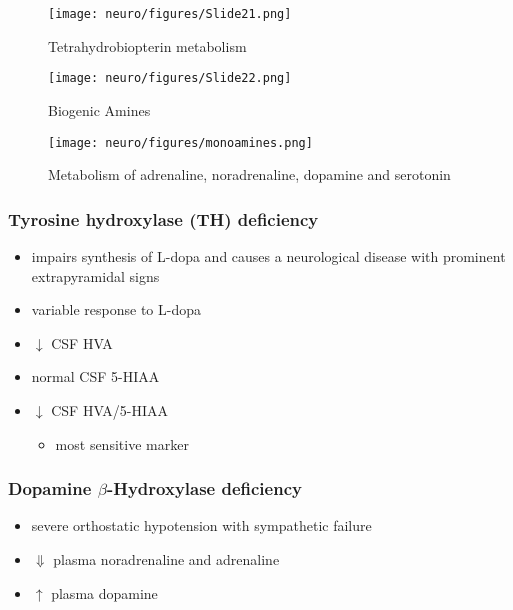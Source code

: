 \documentclass[12pt]{scrartcl}
\begin{document}
\begin{figure}[htbp]
\centering
\texttt{[image: neuro/figures/Slide21.png]}
\caption{\label{fig:orgaa9f3dc}Tetrahydrobiopterin metabolism}
\end{figure}

\begin{figure}[htbp]
\centering
\texttt{[image: neuro/figures/Slide22.png]}
\caption{\label{fig:org3f74000}Biogenic Amines}
\end{figure}

\begin{figure}[htbp]
\centering
\texttt{[image: neuro/figures/monoamines.png]}
\caption{\label{fig:orga8bad62}Metabolism of adrenaline, noradrenaline, dopamine and serotonin}
\end{figure}


\subsubsection{Tyrosine hydroxylase (TH) deficiency}
\label{sec:org1472e75}
\begin{itemize}
\item impairs synthesis of L-dopa and causes a neurological disease with
prominent extrapyramidal signs
\item variable response to L-dopa
\item \(\downarrow\) CSF HVA
\item normal CSF 5-HIAA
\item \(\downarrow\) CSF HVA/5-HIAA
\begin{itemize}
\item most sensitive marker
\end{itemize}
\end{itemize}
\subsubsection{Dopamine \(\beta\)-Hydroxylase deficiency}
\label{sec:orgde415c3}
\begin{itemize}
\item severe orthostatic hypotension with sympathetic failure
\item \(\Downarrow\) plasma noradrenaline and adrenaline
\item \(\uparrow\) plasma dopamine
\end{itemize}
\end{document}
